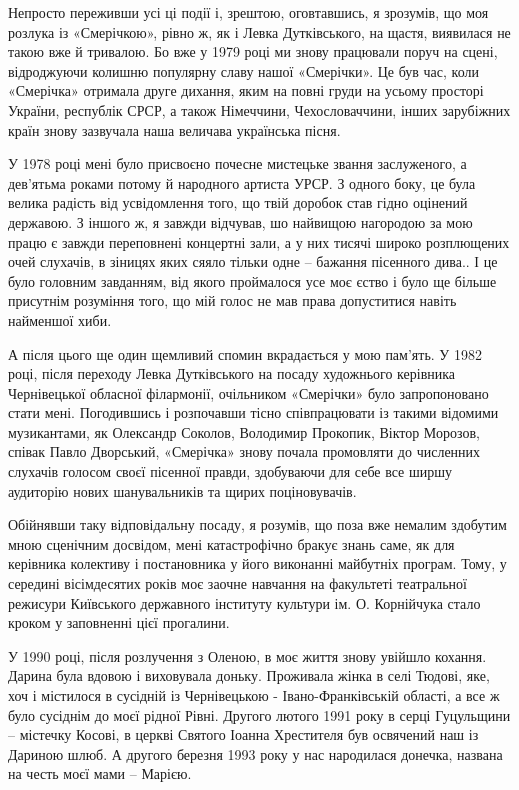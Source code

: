 Непросто переживши усі ці події і, зрештою, оговтавшись, я зрозумів, що моя
розлука із «Смерічкою», рівно ж, як і Левка Дутківського, на щастя, виявилася
не такою вже й тривалою. Бо вже у 1979 році ми знову працювали поруч на сцені,
відроджуючи колишню  популярну славу нашої «Смерічки». Це був час, коли
«Смерічка» отримала друге дихання, яким на повні груди на усьому просторі
України, республік СРСР, а також Німеччини, Чехословаччини, інших зарубіжних
країн знову зазвучала наша величава українська пісня.

У 1978 році мені було присвоєно почесне мистецьке звання заслуженого, а
дев’ятьма роками потому й народного артиста УРСР. З одного боку, це була велика
радість від усвідомлення того, що твій доробок став гідно оцінений державою. З
іншого ж, я завжди відчував, шо найвищою нагородою за мою працю є завжди
переповнені концертні зали, а у них тисячі широко розплющених очей слухачів, в
зіницях яких сяяло тільки одне – бажання пісенного дива.. І це було головним
завданням, від  якого проймалося усе моє єство і було ще більше присутнім
розуміння того, що мій голос не мав права допуститися навіть найменшої хиби.

А після цього ще один щемливий спомин вкрадається у мою пам'ять. У 1982 році,
після переходу Левка Дутківського на посаду художнього керівника Чернівецької
обласної філармонії, очільником «Смерічки» було запропоновано стати мені.
Погодившись і розпочавши тісно співпрацювати із такими відомими музикантами, як
Олександр Соколов, Володимир Прокопик, Віктор Морозов, співак Павло Дворський,
«Смерічка» знову почала промовляти до численних слухачів голосом своєї пісенної
правди, здобуваючи для себе все ширшу аудиторію нових шанувальників та щирих
поціновувачів.

Обійнявши таку відповідальну посаду, я розумів, що поза вже немалим здобутим
мною сценічним досвідом, мені катастрофічно бракує знань саме, як для керівника
колективу і постановника у його виконанні майбутніх програм. Тому, у середині
вісімдесятих років моє заочне навчання  на факультеті театральної режисури
Київського державного інституту культури ім. О. Корнійчука стало кроком у
заповненні цієї прогалини.

У 1990 році, після розлучення з Оленою, в моє життя знову увійшло кохання.
Дарина була вдовою і виховувала доньку. Проживала жінка в селі Тюдові, яке, хоч
і містилося в сусідній із Чернівецькою - Івано-Франківській області, а все ж
було сусіднім до моєї рідної Рівні. Другого лютого 1991 року в серці Гуцульщини
– містечку Косові, в церкві Святого Іоанна Хрестителя був освячений наш із
Дариною шлюб. А другого березня 1993 року у нас народилася донечка, названа на
честь моєї мами – Марією.

